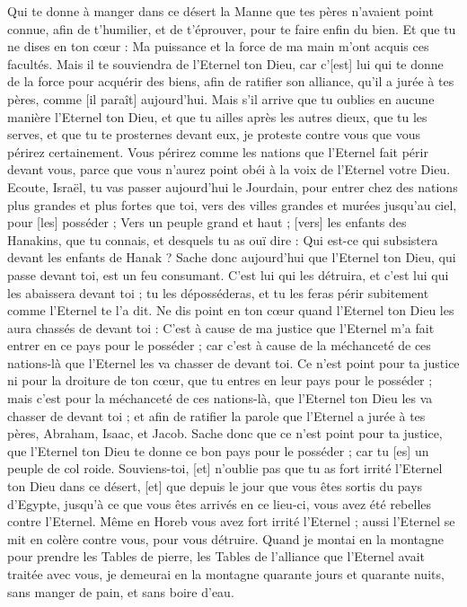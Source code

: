 \begin{multicols}{2}
Qui te donne à manger dans ce désert la Manne que tes pères n'avaient point connue, afin de t'humilier, et de t'éprouver, pour te faire enfin du bien.
Et que tu ne dises en ton cœur : Ma puissance et la force de ma main m'ont acquis ces facultés.
Mais il te souviendra de l'Eternel ton Dieu, car c'[est] lui qui te donne de la force pour acquérir des biens, afin de ratifier son alliance, qu'il a jurée à tes pères, comme [il paraît] aujourd'hui.
Mais s'il arrive que tu oublies en aucune manière l'Eternel ton Dieu, et que tu ailles après les autres dieux, que tu les serves, et que tu te prosternes devant eux, je proteste contre vous que vous périrez certainement.
Vous périrez comme les nations que l'Eternel fait périr devant vous, parce que vous n'aurez point obéi à la voix de l'Eternel votre Dieu.
\VerseOne{}Ecoute, Israël, tu vas passer aujourd'hui le Jourdain, pour entrer chez des nations plus grandes et plus fortes que toi, vers des villes grandes et murées jusqu'au ciel, pour [les] posséder ;
Vers un peuple grand et haut ; [vers] les enfants des Hanakins, que tu connais, et desquels tu as ouï dire : Qui est-ce qui subsistera devant les enfants de Hanak ?
Sache donc aujourd'hui que l'Eternel ton Dieu, qui passe devant toi, est un feu consumant. C'est lui qui les détruira, et c'est lui qui les abaissera devant toi ; tu les déposséderas, et tu les feras périr subitement comme l'Eternel te l'a dit.
Ne dis point en ton cœur quand l'Eternel ton Dieu les aura chassés de devant toi : C'est à cause de ma justice que l'Eternel m'a fait entrer en ce pays pour le posséder ; car c'est à cause de la méchanceté de ces nations-là que l'Eternel les va chasser de devant toi.
Ce n'est point pour ta justice ni pour la droiture de ton cœur, que tu entres en leur pays pour le posséder ; mais c'est pour la méchanceté de ces nations-là, que l'Eternel ton Dieu les va chasser de devant toi ; et afin de ratifier la parole que l'Eternel a jurée à tes pères, Abraham, Isaac, et Jacob.
Sache donc que ce n'est point pour ta justice, que l'Eternel ton Dieu te donne ce bon pays pour le posséder ; car tu [es] un peuple de col roide.
Souviens-toi, [et] n'oublie pas que tu as fort irrité l'Eternel ton Dieu dans ce désert, [et] que depuis le jour que vous êtes sortis du pays d'Egypte, jusqu'à ce que vous êtes arrivés en ce lieu-ci, vous avez été rebelles contre l'Eternel.
Même en Horeb vous avez fort irrité l'Eternel ; aussi l'Eternel se mit en colère contre vous, pour vous détruire.
Quand je montai en la montagne pour prendre les Tables de pierre, les Tables de l'alliance que l'Eternel avait traitée avec vous, je demeurai en la montagne quarante jours et quarante nuits, sans manger de pain, et sans boire d'eau.

\end{multicols}

